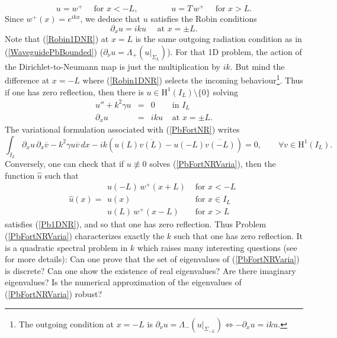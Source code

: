 \documentclass[11pt,a4paper]{report}
\newcommand{\dsp}{\displaystyle}
\newcommand{\mrm}[1]{\mathrm{#1}}
\newcommand{\mH}{\mrm{H}}
\begin{document}
\[
u=w^+\quad\mbox{ for }x<-L,\qquad\qquad u=T\,w^+\quad\mbox{ for }x>L.
\]
Since $w^+(x)=e^{ikx}$, we deduce that $u$ satisfies the Robin conditions 
\begin{equation}\label{Robin1DNR}
\partial_xu=iku\quad \mbox{ at }x=\pm L.
\end{equation}
Note that (\ref{Robin1DNR}) at $x=L$ is the same outgoing radiation condition as in (\ref{WaveguidePbBounded}) ($\partial_\nu u=\Lambda_+(u|_{\Sigma_L})$). For that 1D problem, the action of the Dirichlet-to-Neumann map is just the multiplication by $ik$. But mind the difference at $x=-L$ where (\ref{Robin1DNR}) selects the incoming behaviour\footnote{The outgoing condition at $x=-L$ is $\partial_\nu u=\Lambda_-(u|_{\Sigma_{-L}})\Leftrightarrow -\partial_xu=iku$.}. Thus if one has zero reflection, then there is $u\in\mH^1(I_L)\setminus\{0\}$ solving
\begin{equation}\label{PbFortNR}
\begin{array}{|rcll}
u''+k^2\gamma u&=&0&\mbox{ in }I_L\\[3pt]
\partial_xu&=&iku &\mbox{ at }x=\pm L.
\end{array}
\end{equation}
The variational formulation associated with (\ref{PbFortNR}) writes
\begin{equation}\label{PbFortNRVaria}
\dsp\int_{I_L}\partial_xu\,\partial_x\overline{v}-k^2\gamma u\overline{v}\,dx-ik\left(u(L)\overline{v(L)}-u(-L)\overline{v(-L)}\right)=0,\qquad \forall v\in\mH^1(I_L).
\end{equation}
Conversely, one can check that if $u\not\equiv0$ solves (\ref{PbFortNRVaria}), then the function $\hat{u}$ such that
\[
\hat{u}(x)=\begin{array}{|ll}
u(-L)\,w^+(x+L)&\mbox{ for }x<-L\\[2pt]
u(x)&\mbox{ for }x\in I_L\\[2pt]
u(L)\,w^+(x-L)&\mbox{ for }x>L
\end{array}
\]
satisfies (\ref{Pb1DNR}), and so that one has zero reflection. Thus Problem (\ref{PbFortNRVaria}) characterizes exactly the $k$ such that one has zero reflection. It is a quadratic spectral problem in $k$ which raises many interesting questions (see \cite{HeKS11} for more details): Can one prove that the set of eigenvalues of (\ref{PbFortNRVaria}) is discrete? Can one show the existence of real eigenvalues? Are there imaginary eigenvalues? Is the numerical approximation of the eigenvalues of (\ref{PbFortNRVaria}) robust?\\
\end{document}
